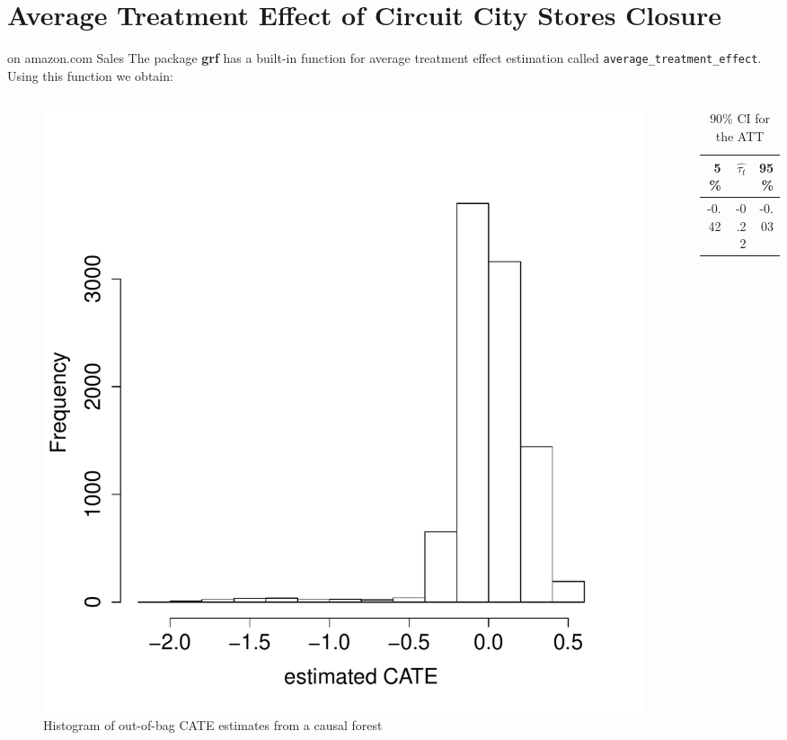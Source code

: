 \documentclass[mathserif, xcolor=table]{beamer}
\begin{document}
\section{Average Treatment Effect of Circuit City Stores Closure}
\begin{frame}{on amazon.com Sales}
The package \textbf{grf} has a built-in function for average treatment effect estimation called \texttt{average\_treatment\_effect}. Using this function we obtain:
\vspace{-1em}
\begin{columns}
\begin{column}{.6\textwidth}
 \begin{figure}[h]
    \centering
    \includegraphics[scale=0.3]{figures/tauhat1_ama_hist.pdf}
    \caption{ Histogram of out-of-bag CATE estimates from a causal forest}
    \label{fig:tauhat1_ama_hist}
\end{figure}
 \end{column}

 \begin{column}{.39\textwidth}
 \begin{table}[h]
\label{}
\caption{90\% CI for the ATT}
\centering
\begin{tabular}{rrr}
  \hline
 5\%  & $\hat{\tau_t}$ & 95\% \\ 
  \hline
-0.42 & -0.22 & -0.03 \\ 
   \hline
\end{tabular}
 \end{table}
 \end{column}
\end{columns}
\end{frame}
\end{document}
